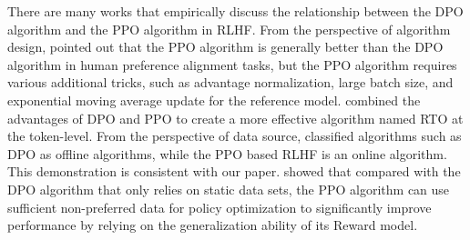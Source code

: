 There are many works that empirically discuss the relationship between the DPO algorithm and the PPO algorithm in RLHF. From the perspective of algorithm design, \cite{xu2024dpo,ivison2024unpacking,yan20243d} pointed out that the PPO algorithm is generally better than the DPO algorithm in human preference alignment tasks, but the PPO algorithm requires various additional tricks, such as advantage normalization, large batch size, and exponential moving average update for the reference model. \cite{zhong2024dpo} combined the advantages of DPO and PPO to create a more effective algorithm named RTO at the token-level. From the perspective of data source, \cite{tang2024understanding} classified algorithms such as DPO as offline algorithms, while the PPO based RLHF is an online algorithm. This demonstration is consistent with our paper. \cite{li2023policy,lin2024limited} showed that compared with the DPO algorithm that only relies on static data sets, the PPO algorithm can use sufficient non-preferred data for policy optimization to significantly improve performance by relying on the generalization ability of its Reward model.